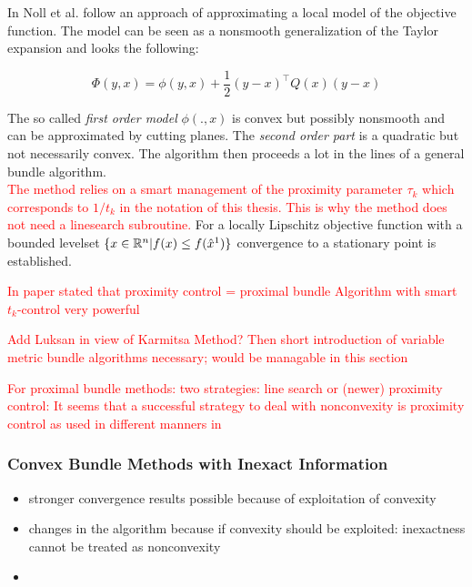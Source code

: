 In \cite{Noll2012} Noll et al. follow an approach of approximating a local model of the objective function. The model can be seen as a nonsmooth generalization of the Taylor expansion and looks the following:

\begin{equation}
	\Phi(y,x) = \phi(y,x)+\frac{1}{2}(y-x)^{\top}Q(x)(y-x)
\label{quad_mod}
\end{equation}

The so called \emph{first order model} \(\phi(.,x)\) is convex but possibly nonsmooth and can be approximated by cutting planes. The \emph{second order part} is a quadratic but not necessarily convex. The algorithm then proceeds a lot in the lines of a general bundle algorithm.\\
\textcolor{red}{The method relies on a smart management of the proximity parameter \(\tau_k\) which corresponds to \(1/t_k\) in the notation of this thesis. This is why the method does not need a linesearch subroutine.}
For a locally Lipschitz objective function with a bounded levelset \(\{x \in \mathbb{R}^n | f(x) \leq f(\hat{x}^1)\}\) convergence to a stationary point is established.

\textcolor{red}{In paper \cite{Noll2012} stated that proximity control = proximal bundle Algorithm with smart \(t_k\)-control very powerful}

\textcolor{red}{Add Luksan in view of Karmitsa Method? Then short introduction of variable metric bundle algorithms necessary; would be managable in this section}

\textcolor{red}{For proximal bundle methods: two strategies: line search or (newer) proximity control: It seems that a successful strategy to deal with nonconvexity is proximity control as used in different manners in \cite{Apkarian2008, Lewis2015, Noll2005, Noll2010, Noll2012, Schramm1992}}


\subsubsection{Convex Bundle Methods with Inexact Information}

\begin{itemize}
	\item stronger convergence results possible because of exploitation of convexity
	\item changes in the algorithm because if convexity should be exploited: inexactness cannot be treated as nonconvexity
	\item 
\end{itemize}


